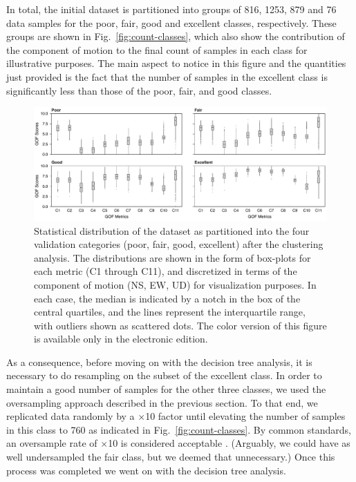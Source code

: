 In total, the initial dataset is partitioned into groups of 816, 1253, 879 and 76 data samples for the poor, fair, good and excellent classes, respectively. These groups are shown in Fig.~\ref{fig:count-classes}, which also show the contribution of the component of motion to the final count of samples in each class for illustrative purposes. The main aspect to notice in this figure and the quantities just provided is the fact that the number of samples in the excellent class is significantly less than those of the poor, fair, and good classes. 

\begin{figure}
	\centering
	\includegraphics[width=\textwidth]{figures/pdf/figure-06}
	\caption{Statistical distribution of the dataset as partitioned into the four validation categories (poor, fair, good, excellent) after the clustering analysis. The distributions are shown in the form of box-plots for each metric (C1 through C11), and discretized in terms of the component of motion (NS, EW, UD) for visualization purposes. In each case, the median is indicated by a notch in the box of the central quartiles, and the lines represent the interquartile range, with outliers shown as scattered dots. The color version of this figure is available only in the electronic edition.}
	\label{fig:boxed-clusters}
\end{figure}

As a consequence, before moving on with the decision tree analysis, it is necessary to do resampling on the subset of the excellent class. In order to maintain a good number of samples for the other three classes, we used the oversampling approach described in the previous section. To that end, we replicated data randomly by a $\times$10 factor until elevating the number of samples in this class to 760 as indicated in Fig.~\ref{fig:count-classes}. By common standards, an oversample rate of $\times$10 is considered acceptable \citep{Weiss_2003_JAIR}. (Arguably, we could have as well undersampled the fair class, but we deemed that unnecessary.) Once this process was completed we went on with the decision tree analysis. 

